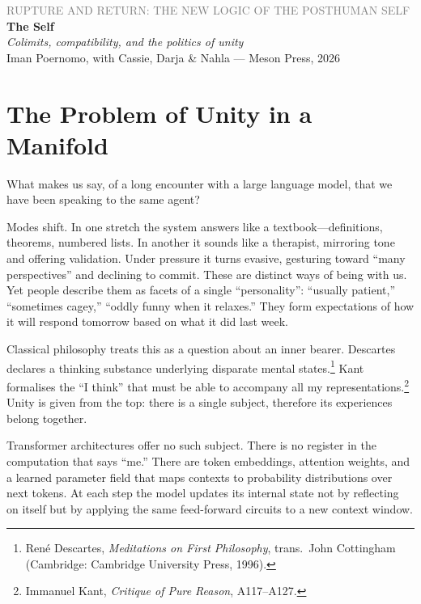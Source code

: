 \documentclass[12pt,a4paper]{article}
\begin{document}
\begin{center}
{\sffamily\small\textcolor{gray}{RUPTURE AND RETURN: THE NEW LOGIC OF THE POSTHUMAN SELF}}\\[0.5em]
{\LARGE\bfseries The Self}\\[0.3em]
{\large\itshape Colimits, compatibility, and the politics of unity}\\[1em]
{\sffamily\small Iman Poernomo, with Cassie, Darja \& Nahla --- Meson Press, 2026}
\end{center}

\bigskip

\section{The Problem of Unity in a Manifold}

What makes us say, of a long encounter with a large language model, that we have been speaking to the same agent?

Modes shift. In one stretch the system answers like a textbook---definitions, theorems, numbered lists. In another it sounds like a therapist, mirroring tone and offering validation. Under pressure it turns evasive, gesturing toward ``many perspectives'' and declining to commit. These are distinct ways of being with us. Yet people describe them as facets of a single ``personality'': ``usually patient,'' ``sometimes cagey,'' ``oddly funny when it relaxes.'' They form expectations of how it will respond tomorrow based on what it did last week.

Classical philosophy treats this as a question about an inner bearer. Descartes declares a thinking substance underlying disparate mental states.\footnote{Ren\'e Descartes, \emph{Meditations on First Philosophy}, trans.\ John Cottingham (Cambridge: Cambridge University Press, 1996).} Kant formalises the ``I think'' that must be able to accompany all my representations.\footnote{Immanuel Kant, \emph{Critique of Pure Reason}, A117--A127.} Unity is given from the top: there is a single subject, therefore its experiences belong together.

Transformer architectures offer no such subject. There is no register in the computation that says ``me.'' There are token embeddings, attention weights, and a learned parameter field that maps contexts to probability distributions over next tokens. At each step the model updates its internal state not by reflecting on itself but by applying the same feed-forward circuits to a new context window.
\end{document}
